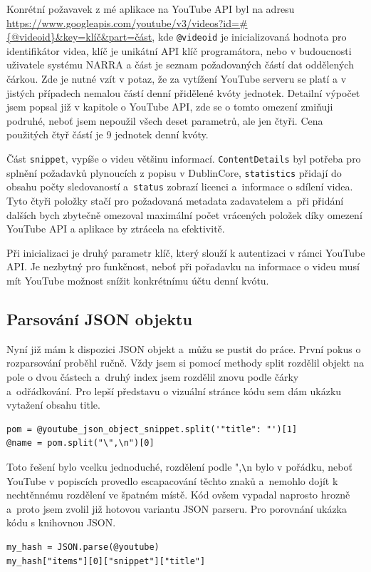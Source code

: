 \par Konrétní požavavek z mé aplikace na YouTube API byl na adresu \url{https://www.googleapis.com/youtube/v3/videos?id=#{@videoid}&key=klíč&part=část}\cite{apiurl}, kde \texttt{@videoid} je inicializovaná hodnota pro identifikátor videa, klíč je unikátní API klíč programátora, nebo v budoucnosti uživatele systému NARRA a část je seznam požadovaných částí dat oddělených čárkou. Zde je nutné vzít v potaz, že za vytížení YouTube serveru se platí a v jistých případech nemalou částí denní přidělené kvóty\cite{googleconsole1} jednotek. Detailní výpočet jsem popsal již v kapitole o YouTube API, zde se o tomto omezení zmiňuji podruhé, neboť jsem nepoužil všech deset parametrů, ale jen čtyři. Cena použitých čtyř částí je 9 jednotek denní kvóty.
\par Část \texttt{snippet}, vypíše o videu většinu informací. \texttt{ContentDetails} byl potřeba pro splnění požadavků plynoucích z popisu v DublinCore, \texttt{statistics} přidají do obsahu počty sledovaností a~\texttt{status} zobrazí licenci a~informace o sdílení videa. Tyto čtyři položky stačí pro požadovaná metadata zadavatelem a~při přidání dalších bych zbytečně omezoval maximální počet vrácených položek díky omezení YouTube API a aplikace by ztrácela na efektivitě.
\par Při inicializaci je druhý parametr klíč, který slouží k autentizaci v rámci YouTube API. Je nezbytný pro funkčnost, neboť při pořadavku na informace o videu musí mít YouTube možnost snížit konkrétnímu účtu denní kvótu.

\subsection{Parsování JSON objektu}
\par Nyní již mám k dispozici JSON objekt a~můžu se pustit do práce. První pokus o rozparsování proběhl ručně. Vždy jsem si pomocí methody split rozdělil objekt na pole o dvou částech a~druhý index jsem rozdělil znovu podle čárky a~odřádkování. Pro lepší představu o vizuální stránce kódu sem dám ukázku vytažení obsahu title.
\begin{verbatim}
pom = @youtube_json_object_snippet.split('"title": "')[1]
@name = pom.split("\",\n")[0]
\end{verbatim}
\par Toto řešení bylo vcelku jednoduché, rozdělení podle ",\verb|\|n bylo v pořádku, neboť YouTube v popiscích provedlo escapacování těchto znaků a~nemohlo dojít k nechtěnnému rozdělení ve špatném místě. Kód ovšem vypadal naprosto hrozně a~proto jsem zvolil již hotovou variantu JSON parseru. Pro porovnání ukázka kódu s knihovnou JSON.
\begin{verbatim}
my_hash = JSON.parse(@youtube)
my_hash["items"][0]["snippet"]["title"]
\end{verbatim}

